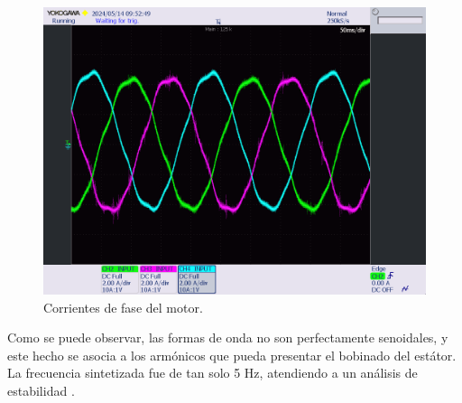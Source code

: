 \begin{figure}[H]
	\centering
	\includegraphics[width=0.7\linewidth]{fig/mavilorCurrent}
	\caption{Corrientes de fase del motor.}
\end{figure}

Como se puede observar, las formas de onda no son perfectamente senoidales, y este hecho se asocia a los armónicos que pueda presentar el bobinado del estátor. La frecuencia sintetizada fue de tan solo 5 Hz, atendiendo a un análisis de estabilidad \cite{Montesinos2008}.


